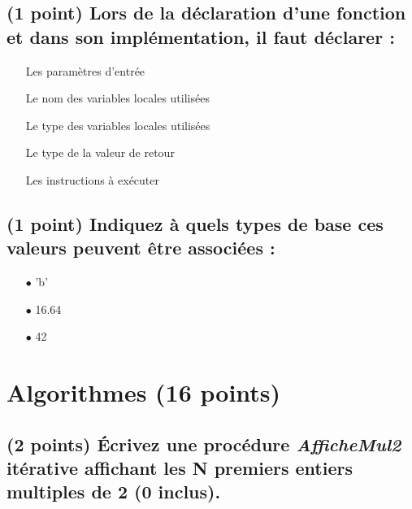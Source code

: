 \documentclass[11pt,a4paper]{article}
\begin{document}
\bigskip

\subsection{(1 point) Lors de la déclaration d'une fonction et dans son implémentation, il faut déclarer : }

\bigskip

\begin{itemize}
  \item[\CaseCoche] Les paramètres d'entrée   \phantom{(}
  \item[\CaseCoche] Le nom des variables locales utilisées   \phantom{(}
  \item[\CaseCoche] Le type des variables locales utilisées   \phantom{(}
  \item[\CaseCoche] Le type de la valeur de retour   \phantom{(}
  \item[\CaseCoche] Les instructions à exécuter   \phantom{(}
\end{itemize}

\bigskip

\subsection{(1 point) Indiquez à quels types de base ces valeurs peuvent être associées : }

\bigskip

\begin{itemize}
  \item[$\bullet$] 'b'     \phantom{(} \\
  \item[$\bullet$] 16.64   \phantom{(} \\
  \item[$\bullet$] 42     \phantom{(} \\
\end{itemize}

\vfillLast

\newpage


\section{Algorithmes (16 points)}

\subsection{(2 points) \'Ecrivez une procédure \og \textit{AfficheMul2} \fg{} itérative affichant les N premiers entiers multiples de 2 (0 inclus). }
\end{document}

